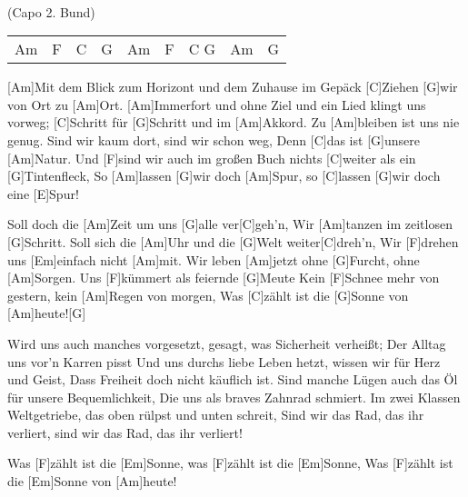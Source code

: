 
\\
{\footnotesize(Capo 2. Bund)}

\begin{guitar}
	{\footnotesize\begin{tabular}{l|l|l|l|l|l|l|l|l}
			Am & F & C & G & Am & F & C G & Am & G 
	\end{tabular}}
	
	[Am]Mit dem Blick zum Horizont und dem Zuhause im Gepäck
	[C]Ziehen [G]wir von Ort zu [Am]Ort.
	[Am]Immerfort und ohne Ziel und ein Lied klingt uns vorweg;
	[C]Schritt für [G]Schritt und im [Am]Akkord.
	Zu [Am]bleiben ist uns nie genug. Sind wir kaum dort, sind wir schon weg,
	Denn [C]das ist [G]unsere [Am]Natur.
	Und [F]sind wir auch im großen Buch nichts [C]weiter als ein [G]Tintenfleck,
	So [Am]lassen [G]wir doch [Am]Spur, so [C]lassen [G]wir doch eine [E]Spur!
	
	Soll doch die [Am]Zeit um uns [G]alle ver[C]geh'n,
	Wir [Am]tanzen im zeitlosen [G]Schritt.
	Soll sich die [Am]Uhr und die [G]Welt weiter[C]dreh'n, 
	Wir [F]drehen uns [Em]einfach nicht [Am]mit.
	Wir leben [Am]jetzt ohne [G]Furcht, ohne [Am]Sorgen.
	Uns [F]kümmert als feiernde [G]Meute
	Kein [F]Schnee mehr von gestern, kein [Am]Regen von morgen,
	Was [C]zählt ist die [G]Sonne von [Am]heute![G]{}
	
	
	\pagebreak
	
	Wird uns auch manches vorgesetzt, gesagt, was Sicherheit verheißt;
	Der Alltag uns vor'n Karren pisst
	Und uns durchs liebe Leben hetzt, wissen wir für Herz und Geist,
	Dass Freiheit doch nicht käuflich ist.
	Sind manche Lügen auch das Öl für unsere Bequemlichkeit,
	Die uns als braves Zahnrad schmiert.
	Im zwei Klassen Weltgetriebe, das oben rülpst und unten schreit,
	Sind wir das Rad, das ihr verliert, sind wir das Rad, das ihr verliert!
	
	Was [F]zählt ist die [Em]Sonne, was [F]zählt ist die [Em]Sonne, 
	Was [F]zählt ist die [Em]Sonne von [Am]heute!
	

\end{guitar}
